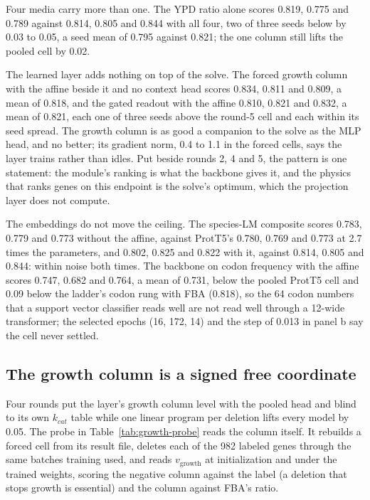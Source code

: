 Four media carry more than one. The YPD ratio alone scores 0.819, 0.775 and 0.789
against 0.814, 0.805 and 0.844 with all four, two of three seeds below by 0.03 to 0.05,
a seed mean of 0.795 against 0.821; the one column still lifts the pooled cell by 0.02.

The learned layer adds nothing on top of the solve. The forced growth column with the
affine beside it and no context head scores 0.834, 0.811 and 0.809, a mean of 0.818, and
the gated readout with the affine 0.810, 0.821 and 0.832, a mean of 0.821, each one of
three seeds above the round-5 cell and each within its seed spread. The growth column is
as good a companion to the solve as the MLP head, and no better; its gradient norm, 0.4
to 1.1 in the forced cells, says the layer trains rather than idles. Put beside rounds 2,
4 and 5, the pattern is one statement: the module's ranking is what the backbone gives
it, and the physics that ranks genes on this endpoint is the solve's optimum, which the
projection layer does not compute.

The embeddings do not move the ceiling. The species-LM composite scores 0.783, 0.779 and
0.773 without the affine, against ProtT5's 0.780, 0.769 and 0.773 at 2.7 times the
parameters, and 0.802, 0.825 and 0.822 with it, against 0.814, 0.805 and 0.844: within
noise both times. The backbone on codon frequency with the affine scores 0.747, 0.682 and
0.764, a mean of 0.731, below the pooled ProtT5 cell and 0.09 below the ladder's codon
rung with FBA (0.818), so the 64 codon numbers that a support vector classifier reads
well are not read well through a 12-wide transformer; the selected epochs (16, 172, 14)
and the step of 0.013 in panel b say the cell never settled.

\subsection{The growth column is a signed free coordinate}

Four rounds put the layer's growth column level with the pooled head and blind to its
own $k_{cat}$ table while one linear program per deletion lifts every model by 0.05. The
probe in Table~\ref{tab:growth-probe} reads the column itself. It rebuilds a forced cell
from its result file, deletes each of the 982 labeled genes through the same batches
training used, and reads $v_{\text{growth}}$ at initialization and under the trained
weights, scoring the negative column against the label (a deletion that stops growth is
essential) and the column against FBA's ratio.

